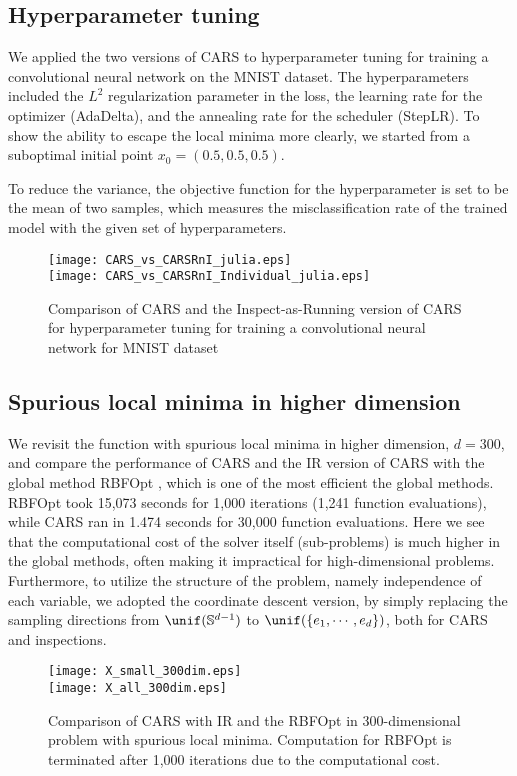 \subsection*{Hyperparameter tuning}
We applied the two versions of CARS to hyperparameter tuning for training a convolutional neural network on the MNIST dataset.
The hyperparameters included the $L^2$ regularization parameter in the loss, the learning rate for the optimizer (AdaDelta), and the annealing rate for the scheduler (StepLR). To show the ability to escape the local minima more clearly, we started from a suboptimal initial point $x_0 = (0.5, 0.5, 0.5)$.

To reduce the variance, the objective function for the hyperparameter is set to be the mean of two samples, which measures the misclassification rate of the trained model with the given set of hyperparameters.

\begin{figure}
    \centering
    {\texttt{[image: CARS\_vs\_CARSRnI\_julia.eps]}}\\
    \vspace{3mm}
    {\texttt{[image: CARS\_vs\_CARSRnI\_Individual\_julia.eps]}}
    \caption{Comparison of CARS and the Inspect-as-Running version of CARS for hyperparameter tuning for training a convolutional neural network for MNIST dataset}
    \label{fig: HP Tuning - MNIST}
\end{figure}

\subsection*{Spurious local minima in higher dimension}
We revisit the function with spurious local minima in higher dimension, $d=300$, and compare the performance of CARS and the IR version of CARS with the global method RBFOpt \cite{costa2018rbfopt}, which is one of the most efficient the global methods.
RBFOpt took 15,073 seconds for 1,000 iterations (1,241 function evaluations), while CARS ran in 1.474 seconds for 30,000 function evaluations.
Here we see that the computational cost of the solver itself (sub-problems) is much higher in the global methods, often making it impractical for high-dimensional problems.
Furthermore, to utilize the structure of the problem, namely independence of each variable, we adopted the coordinate descent version, by simply replacing the sampling directions from $\unif(\mathbb{S}^{d-1})$ to $\unif(\{e_1, \cdots, e_d\})$, both for CARS and inspections.
\begin{figure}
    \centering
    {\texttt{[image: X\_small\_300dim.eps]}} \\
    \vspace{3mm}
    {\texttt{[image: X\_all\_300dim.eps]}}
    \caption{Comparison of CARS with IR and the RBFOpt in 300-dimensional problem with spurious local minima. Computation for RBFOpt is terminated after 1,000 iterations due to the computational cost.}
\end{figure}
